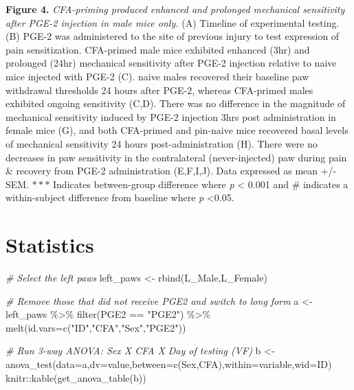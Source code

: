 \documentclass[
]{book}
\newenvironment{Shaded}{\begin{snugshade}}{\end{snugshade}}
\newcommand{\AttributeTok}[1]{\textcolor[rgb]{0.77,0.63,0.00}{#1}}
\newcommand{\CommentTok}[1]{\textcolor[rgb]{0.56,0.35,0.01}{\textit{#1}}}
\newcommand{\FunctionTok}[1]{\textcolor[rgb]{0.00,0.00,0.00}{#1}}
\newcommand{\NormalTok}[1]{#1}
\newcommand{\OtherTok}[1]{\textcolor[rgb]{0.56,0.35,0.01}{#1}}
\newcommand{\SpecialCharTok}[1]{\textcolor[rgb]{0.00,0.00,0.00}{#1}}
\newcommand{\StringTok}[1]{\textcolor[rgb]{0.31,0.60,0.02}{#1}}
\begin{document}
\textbf{Figure 4.} \emph{CFA-priming produced enhanced and prolonged mechanical sensitivity after PGE-2 injection in male mice only.} (A) Timeline of experimental testing. (B) PGE-2 was administered to the site of previous injury to test expression of pain sensitization. CFA-primed male mice exhibited enhanced (3hr) and prolonged (24hr) mechanical sensitivity after PGE-2 injection relative to naive mice injected with PGE-2 (C). naive males recovered their baseline paw withdrawal thresholds 24 hours after PGE-2, whereas CFA-primed males exhibited ongoing sensitivity (C,D). There was no difference in the magnitude of mechanical sensitivity induced by PGE-2 injection 3hrs post administration in female mice (G), and both CFA-primed and pin-naive mice recovered basal levels of mechanical sensitivity 24 hours post-administration (H). There were no decreases in paw sensitivity in the contralateral (never-injected) paw during pain \& recovery from PGE-2 administration (E,F,I,J). Data expressed as mean +/- SEM. \(***\) Indicates between-group difference where \emph{p} \textless{} 0.001 and \# indicates a within-subject difference from baseline where \emph{p} \textless0.05.

\hypertarget{statistics}{%
\section*{Statistics}\label{statistics}}

\begin{Shaded}
\begin{Highlighting}[]
\CommentTok{\# Select the left paws}
\NormalTok{left\_paws }\OtherTok{\textless{}{-}} \FunctionTok{rbind}\NormalTok{(L\_Male,L\_Female)}

\CommentTok{\# Remove those that did not receive PGE2 and switch to long form}
\NormalTok{a }\OtherTok{\textless{}{-}}\NormalTok{ left\_paws }\SpecialCharTok{\%\textgreater{}\%}
  \FunctionTok{filter}\NormalTok{(PGE2 }\SpecialCharTok{==} \StringTok{"PGE2"}\NormalTok{) }\SpecialCharTok{\%\textgreater{}\%}
  \FunctionTok{melt}\NormalTok{(}\AttributeTok{id.vars=}\FunctionTok{c}\NormalTok{(}\StringTok{"ID"}\NormalTok{,}\StringTok{"CFA"}\NormalTok{,}\StringTok{"Sex"}\NormalTok{,}\StringTok{"PGE2"}\NormalTok{))}

\CommentTok{\# Run 3{-}way ANOVA: Sex X CFA X Day of testing (VF)}
\NormalTok{b }\OtherTok{\textless{}{-}} \FunctionTok{anova\_test}\NormalTok{(}\AttributeTok{data=}\NormalTok{a,}\AttributeTok{dv=}\NormalTok{value,}\AttributeTok{between=}\FunctionTok{c}\NormalTok{(Sex,CFA),}\AttributeTok{within=}\NormalTok{variable,}\AttributeTok{wid=}\NormalTok{ID)}
\NormalTok{knitr}\SpecialCharTok{::}\FunctionTok{kable}\NormalTok{(}\FunctionTok{get\_anova\_table}\NormalTok{(b))}
\end{Highlighting}
\end{Shaded}
\end{document}
